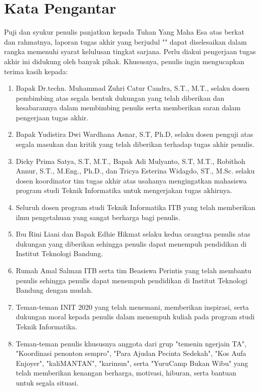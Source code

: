 \chapter*{Kata Pengantar}

Puji dan syukur penulis panjatkan kepada Tuhan Yang Maha Esa atas berkat dan rahmatnya, laporan tugas akhir yang berjudul "\thetitle" dapat diselesaikan dalam rangka memenuhi syarat kelulusan tingkat sarjana. Perlu diakui pengerjaan tugas akhir ini didukung oleh banyak pihak. Khususnya, penulis ingin mengucapkan terima kasih kepada:

\begin{enumerate}
  \item Bapak Dr.techn. Muhammad Zuhri Catur Candra, S.T., M.T., selaku dosen pembimbing atas segala bentuk dukungan yang telah diberikan dan kesabarannya dalam membimbing penulis serta memberikan saran dalam pengerjaan tugas akhir.
  \item Bapak Yudistira Dwi Wardhana Asnar, S.T, Ph.D, selaku dosen penguji atas segala masukan dan kritik yang telah diberikan terhadap tugas akhir penulis.
  \item Dicky Prima Satya, S.T, M.T., Bapak Adi Mulyanto, S.T, M.T., Robithoh Annur, S.T., M.Eng., Ph.D., dan Tricya Esterina Widagdo, ST., M.Sc. selaku dosen koordinator tim tugas akhir atas usahanya mengingatkan mahasiswa program studi Teknik Informatika untuk mengerjakan tugas akhirnya.
  \item Seluruh dosen program studi Teknik Informatika ITB yang telah memberikan ilmu pengetahuan yang sangat berharga bagi penulis.
  \item Ibu Rini Liani dan Bapak Edhie Hikmat selaku kedua orangtua penulis atas dukungan yang diberikan sehingga penulis dapat menempuh pendidikan di Institut Teknologi Bandung.
  \item Rumah Amal Salman ITB serta tim Beasiswa Perintis yang telah membantu penulis sehingga penulis dapat menempuh pendidikan di Institut Teknologi Bandung dengan mudah.
  \item Teman-teman INIT 2020 yang telah menemani, memberikan inspirasi, serta dukungan moral kepada penulis dalam menempuh kuliah pada program studi Teknik Informatika.
  \item Teman-teman penulis khususnya anggota dari grup "temenin ngerjain TA", "Koordinasi penonton sempro", "Para Ajudan Pecinta Sedekah", "Kos Aufa Enjoyer", "kaliMANTAN", "karimun", serta "YuruCamp Bukan Wibu" yang telah memberikan kenangan berharga, motivasi, hiburan, serta bantuan untuk segala situasi.

\end{enumerate}
